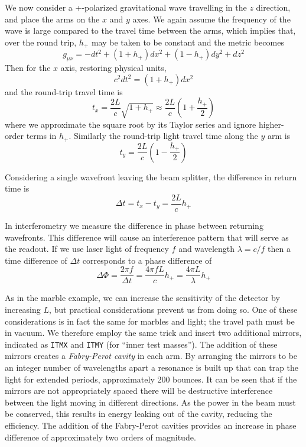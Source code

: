 We now consider a +-polarized gravitational wave travelling in the $z$
direction, and place the arms on the $x$ and $y$ axes.  We again
assume the frequency of the wave is large compared to the travel time
between the arms, which implies that, over the round trip, $h_+$ may be
taken to be constant and the metric becomes
%
\begin{equation*}
g_{\mu\nu} = -dt^2 + (1+h_+) dx^2 + (1-h_+) dy^2 + dz^2
\end{equation*}
%
Then for the $x$ axis, restoring physical units,
%
\begin{equation*}
c^2 dt^2 = (1+h_+) dx^2
\end{equation*}
%
and the round-trip travel time is
%
\begin{equation*}
t_x = \frac{2L}{c} \sqrt{1+h_+} \approx \frac{2L}{c} \left(1+\frac{h_+}{2} \right)
\end{equation*}
%
where we approximate the square root by its Taylor series and ignore
higher-order terms in $h_+$.  Similarly the round-trip light travel
time along the $y$ arm is
%
\begin{equation*}
t_y = \frac{2L}{c} \left(1-\frac{h_+}{2} \right)
\end{equation*}

Considering a single wavefront leaving the beam splitter, the
difference in return time is
%
\begin{equation*}
\Delta t = t_x - t_y = \frac{2L}{c} h_+
\end{equation*}

In interferometry we measure the difference in phase between returning
wavefronts.  This difference will cause an interference pattern that
will serve as the readout.  If we use laser light of frequency $f$ and
wavelength $\lambda = c/f$ then a time difference of $\Delta t$
corresponds to a phase difference of 
%
\begin{equation*}
\Delta \Phi = \frac{2\pi f}{\Delta t} = \frac{4\pi f L}{c} h_+
= \frac{4\pi L}{\lambda} h_+
\end{equation*}

As in the marble example, we can increase the sensitivity of the
detector by increasing $L$, but practical considerations prevent us
from doing so.  One of these considerations is in fact the same for
marbles and light; the travel path must be in vacuum.  We therefore
employ the same trick and insert two additional mirrors, indicated as
\texttt{ITMX} and \texttt{ITMY} (for ``inner test masses'').  The
addition of these mirrors creates a \emph{Fabry-Perot cavity} in each
arm.  By arranging the mirrors to be an integer number of wavelengths
apart a resonance is built up that can trap the light for extended
periods, approximately 200 bounces.  It can be seen that if the
mirrors are not appropriately spaced there will be destructive
interference between the light moving in different directions.  As the
power in the beam must be conserved, this results in energy leaking
out of the cavity, reducing the efficiency.  The addition of the
Fabry-Perot cavities provides an increase in phase difference of
approximately two orders of magnitude. 

